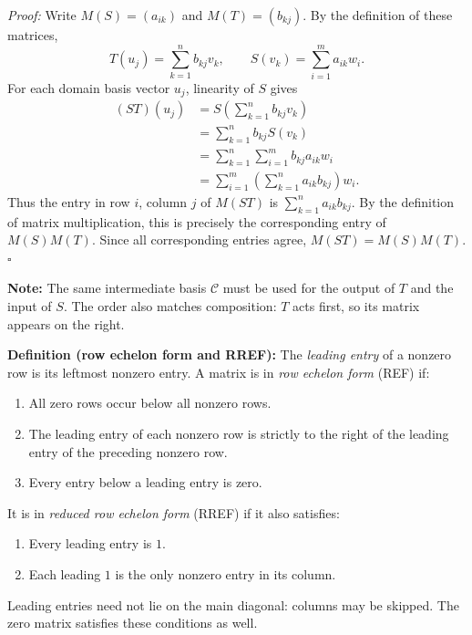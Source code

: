 \documentclass[a4paper,11pt,abstract=true]{scrartcl}
\theoremstyle{dotlessP}
\theoremstyle{dotlessS}
\theoremstyle{remark}
\theoremstyle{definition}
\begin{document}
\begin{claim_box}
\textit{Proof:} Write $M(S)=(a_{ik})$ and $M(T)=(b_{kj})$.
By the definition of these matrices,
\[
T(u_j)=\sum_{k=1}^n b_{kj}v_k,
\qquad S(v_k)=\sum_{i=1}^m a_{ik}w_i.
\]
For each domain basis vector $u_j$, linearity of $S$ gives
\[
\begin{aligned}
(ST)(u_j)
&=S\left(\sum_{k=1}^n b_{kj}v_k\right)\\
&=\sum_{k=1}^n b_{kj}S(v_k)\\
&=\sum_{k=1}^n\sum_{i=1}^m b_{kj}a_{ik}w_i\\
&=\sum_{i=1}^m\left(\sum_{k=1}^n a_{ik}b_{kj}\right)w_i.
\end{aligned}
\]
Thus the entry in row $i$, column $j$ of $M(ST)$ is
$\sum_{k=1}^n a_{ik}b_{kj}$. By the definition of matrix multiplication,
this is precisely the corresponding entry of $M(S)M(T)$.
Since all corresponding entries agree, $M(ST)=M(S)M(T)$.
\hfill$\square$
\end{claim_box}

\begin{remark_box}
\textbf{Note:} The same intermediate basis $\mathcal{C}$ must be
used for the output of $T$ and the input of $S$. The order also matches
composition: $T$ acts first, so its matrix appears on the right.
\end{remark_box}

\begin{definition_box}
\textbf{Definition (row echelon form and RREF):} The
\emph{leading entry} of a nonzero row is its leftmost nonzero entry.
A matrix is in \emph{row echelon form} (REF) if:
\begin{enumerate}
    \item All zero rows occur below all nonzero rows.
    \item The leading entry of each nonzero row is strictly to the
    right of the leading entry of the preceding nonzero row.
    \item Every entry below a leading entry is zero.
\end{enumerate}
It is in \emph{reduced row echelon form} (RREF) if it also satisfies:
\begin{enumerate}
    \item Every leading entry is $1$.
    \item Each leading $1$ is the only nonzero entry in its column.
\end{enumerate}
Leading entries need not lie on the main diagonal: columns may be
skipped. The zero matrix satisfies these conditions as well.
\end{definition_box}
\end{document}
